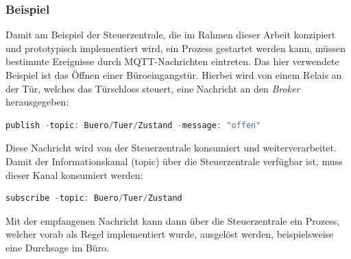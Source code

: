             \subsubsection*{Beispiel}
            \label{subsubsec:pubsub-example}
            Damit am Beispiel der Steuerzentrale, die im Rahmen dieser Arbeit konzipiert und prototypisch implementiert wird, 
            ein Prozess gestartet werden kann, müssen bestimmte Ereignisse durch \acs{MQTT}-Nachrichten eintreten. Das hier 
            verwendete Beispiel ist das Öffnen einer Büroeingangstür. Hierbei wird von einem Relais an der Tür, welches das 
            Türschloss steuert, eine Nachricht an den \textit{Broker} herausgegeben:
            \\
            \begin{lstlisting}[language=Java, frame=lines, xleftmargin=\parindent, style=algoBericht, label={code:pubmqtt}, captionpos=b, caption={Erzeugung und Veröffentlichung einer Nachricht}]
                publish -topic: Buero/Tuer/Zustand -message: "offen"
            \end{lstlisting}
            Diese Nachricht wird von der Steuerzentrale konsumiert und weiterverarbeitet. Damit der Informationskanal (topic) 
            über die Steuerzentrale verfügbar ist, muss dieser Kanal konsumiert werden: 
            \\
            \begin{lstlisting}[language=Java, frame=lines, xleftmargin=\parindent, style=algoBericht, label={code:submqtt}, captionpos=b, caption={Empfang und Konsum einer Nachricht}]
                subscribe -topic: Buero/Tuer/Zustand
            \end{lstlisting}
            Mit der empfangenen Nachricht kann dann über die Steuerzentrale ein Prozess, welcher vorab als Regel implementiert wurde, ausgelöst werden, 
            beispielsweise eine Durchsage im Büro.
    \pagebreak

